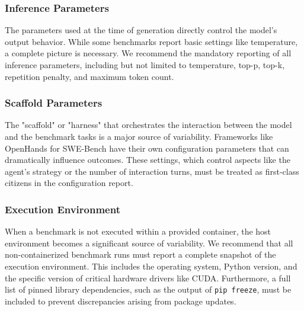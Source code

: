 \documentclass[sigconf,review]{acmart}
\begin{document}

\subsubsection{Inference Parameters}
The parameters used at the time of generation directly control the model's output behavior. While some benchmarks report basic settings like temperature, a complete picture is necessary. We recommend the mandatory reporting of all inference parameters, including but not limited to temperature, top-p, top-k, repetition penalty, and maximum token count.


\subsubsection{Scaffold Parameters}
The "scaffold" or "harness" that orchestrates the interaction between the model and the benchmark tasks is a major source of variability. Frameworks like OpenHands for SWE-Bench have their own configuration parameters that can dramatically influence outcomes. These settings, which control aspects like the agent's strategy or the number of interaction turns, must be treated as first-class citizens in the configuration report.


\subsubsection{Execution Environment}
When a benchmark is not executed within a provided container, the host environment becomes a significant source of variability. We recommend that all non-containerized benchmark runs must report a complete snapshot of the execution environment. This includes the operating system, Python version, and the specific version of critical hardware drivers like CUDA. Furthermore, a full list of pinned library dependencies, such as the output of \texttt{pip freeze}, must be included to prevent discrepancies arising from package updates.
\end{document}
